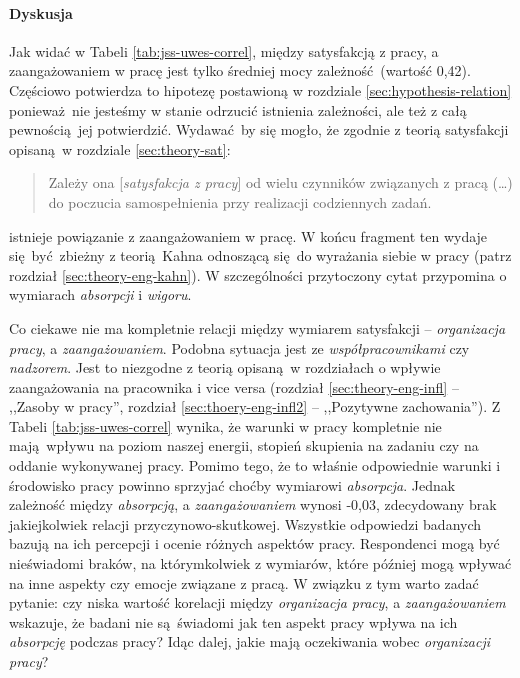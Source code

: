 \paragraph{Dyskusja}
Jak widać w Tabeli \ref{tab:jss-uwes-correl}, między satysfakcją z pracy, a zaangażowaniem w pracę jest tylko średniej mocy zależność (wartość 0,42). Częściowo potwierdza to hipotezę postawioną w rozdziale \ref{sec:hypothesis-relation} ponieważ nie jesteśmy w stanie odrzucić istnienia zależności, ale też z całą pewnością jej potwierdzić. Wydawać by się mogło, że zgodnie z teorią satysfakcji \cite{SchultzSat} opisaną w rozdziale \ref{sec:theory-sat}:

\begin{quote}
  Zależy ona [\textit{satysfakcja z pracy}] od wielu czynników związanych z pracą (\ldots) do poczucia samospełnienia przy realizacji codziennych zadań.
\end{quote}

istnieje powiązanie z zaangażowaniem w pracę. W końcu fragment ten wydaje się być zbieżny z teorią Kahna odnoszącą się do wyrażania siebie w pracy (patrz rozdział \ref{sec:theory-eng-kahn}). W szczególności przytoczony cytat przypomina o wymiarach \textit{absorpcji} i \textit{wigoru}. 

Co ciekawe nie ma kompletnie relacji między wymiarem satysfakcji -- \textit{organizacja pracy}, a \textit{zaangażowaniem}. Podobna sytuacja jest ze \textit{współpracownikami} czy \textit{nadzorem}. Jest to niezgodne z teorią opisaną w rozdziałach o wpływie zaangażowania na pracownika i vice versa (rozdział \ref{sec:theory-eng-infl} -- ,,Zasoby w pracy'', rozdział \ref{sec:thoery-eng-infl2} -- ,,Pozytywne zachowania''). Z Tabeli \ref{tab:jss-uwes-correl} wynika, że warunki w pracy kompletnie nie mają wpływu na poziom naszej energii, stopień skupienia na zadaniu czy na oddanie
wykonywanej pracy. Pomimo tego, że to właśnie odpowiednie warunki i środowisko pracy powinno sprzyjać choćby wymiarowi \textit{absorpcja}. Jednak zależność między \textit{absorpcją}, a \textit{zaangażowaniem} wynosi
-0,03, zdecydowany brak jakiejkolwiek relacji przyczynowo-skutkowej. Wszystkie odpowiedzi badanych bazują na ich percepcji i ocenie różnych aspektów pracy. Respondenci mogą być nieświadomi braków, na którymkolwiek z wymiarów, które później mogą wpływać na inne aspekty czy emocje związane z pracą. W związku z tym warto zadać pytanie: czy niska wartość korelacji między \textit{organizacja pracy}, a \textit{zaangażowaniem} wskazuje, że badani nie są świadomi jak ten aspekt pracy wpływa na ich \textit{absorpcję} podczas pracy? Idąc dalej, jakie mają oczekiwania wobec
\textit{organizacji pracy}?

